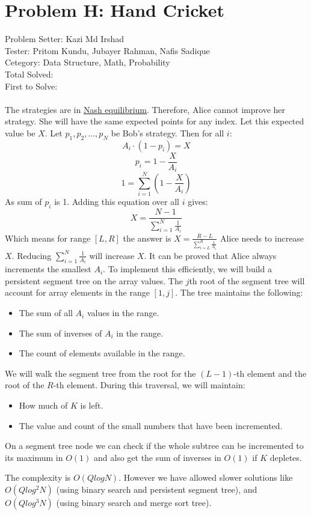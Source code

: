\section*{Problem H: Hand Cricket}
Problem Setter: Kazi Md Irshad \\
Tester: Pritom Kundu, Jubayer Rahman, Nafis Sadique \\
Cetegory: Data Structure, Math, Probability \\
Total Solved:  \\
First to Solve: \\
\\
The strategies are in \href{https://en.wikipedia.org/wiki/Nash_equilibrium}{Nash equilibrium}. Therefore, Alice cannot improve her strategy. She will have the same expected points for any index. Let this expected value be $X$. Let $p_1, p_2, \dots, p_N$ be Bob's strategy. Then for all $i$:
$$ A_i \cdot (1 - p_i) = X $$
$$p_i = 1 - \frac{X}{A_i}$$
$$1 = \sum_{i=1}^N(1-\frac{X}{A_i})$$
As sum of $p_i$ is 1. Adding this equation over all $i$ gives:
$$ X = \frac{N - 1}{\sum_{i=1}^N \frac{1}{A_i}}$$ 
Which means for range $[L,R]$ the answer is $X = \frac{R-L}{\sum_{i=L}^R \frac{1}{A_i}}$
Alice needs to increase $X$. Reducing $\sum_{i=1}^N \frac{1}{A_i}$ will increase $X$. It can be proved that Alice always increments the smallest $A_i$. To implement this efficiently, we will build a persistent segment tree on the array values. The $j$th root of the segment tree will account for array elements in the range $[1, j]$. The tree maintains the following:
\begin{itemize}
    \item The sum of all $A_i$ values in the range.
    \item The sum of inverses of $A_i$ in the range.
    \item The count of elements available in the range.
\end{itemize}
We will walk the segment tree from the root for the $(L-1)$-th element and the root of the $R$-th element. During this traversal, we will maintain:
\begin{itemize}
    \item How much of $K$ is left.
    \item The value and count of the small numbers that have been incremented.
\end{itemize}
On a segment tree node we can check if the whole subtree can be incremented to its maximum in $O(1)$ and also get the sum of inverses in $O(1)$ if $K$ depletes.

The complexity is $O(QlogN)$. However we have allowed slower solutions like $O(Qlog^2N)$ (using binary search and persistent segment tree), and $O(Qlog^3N)$ (using binary search and merge sort tree).
